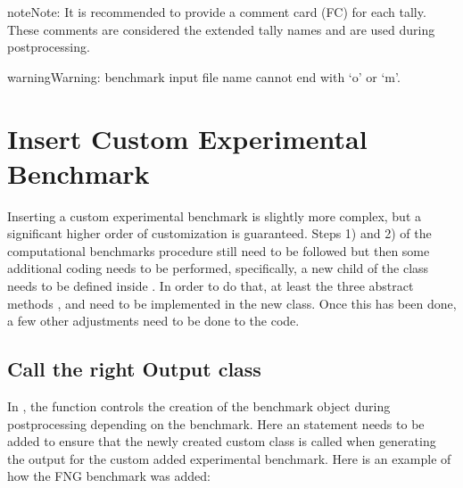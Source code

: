 \documentclass[letterpaper,10pt,english]{sphinxmanual}
\begin{document}
\begin{sphinxadmonition}{note}{Note:}
\sphinxAtStartPar
It is recommended to provide a comment card (FC) for each tally. These comments are considered the
extended tally names and are used during post\sphinxhyphen{}processing.
\end{sphinxadmonition}

\begin{sphinxadmonition}{warning}{Warning:}
\sphinxAtStartPar
benchmark input file name cannot end with ‘o’ or ‘m’.
\end{sphinxadmonition}


\section{Insert Custom Experimental Benchmark}
\label{\detokenize{dev/insertbenchmarks:insert-custom-experimental-benchmark}}\label{\detokenize{dev/insertbenchmarks:customexpbench}}
\sphinxAtStartPar
Inserting a custom experimental benchmark is slightly more complex, but a significant higher order
of customization is guaranteed.
Steps 1) and 2) of the computational benchmarks procedure still need to be followed but then some
additional coding needs to be performed, specifically, a new child of the {\hyperref[\detokenize{api/postprocessing:expoutputclass}]{}}
class needs to be defined inside .
In order to do that, at least the three abstract methods , 
and  need to be implemented in the new class.
Once this has been done, a few other adjustments need to be done to the code.


\subsection{Call the right Output class}
\label{\detokenize{dev/insertbenchmarks:call-the-right-output-class}}
\sphinxAtStartPar
In , the function  controls the creation of the
benchmark object during post\sphinxhyphen{}processing depending on the benchmark. Here an  statement needs
to be added to ensure that the newly created custom class is called when generating the output for
the custom added experimental benchmark. Here is an example of how the FNG benchmark was added:
\end{document}
